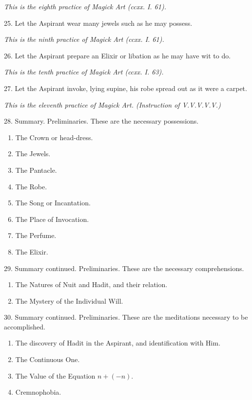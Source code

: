 \textit{This is the eighth practice of Magick Art (ccxx. I. 61).}

25. Let the Aspirant wear many jewels such as he may possess.

\textit{This is the ninth practice of Magick Art (ccxx. I. 61).}

26. Let the Aspirant prepare an Elixir or libation as he may have wit to do.

\textit{This is the tenth practice of Magick Art (ccxx. I. 63).}

27. Let the Aspirant invoke, lying supine, his robe spread out as it were a carpet.

\textit{This is the eleventh practice of Magick Art. (Instruction of V.V.V.V.V.)}

28. Summary. Preliminaries. These are the necessary possessions.
\begin{enumerate}[leftmargin=4\parindent]
\item The Crown or head-dress.
\item The Jewels.
\item The Pantacle.
\item The Robe.
\item The Song or Incantation.
\item The Place of Invocation.
\item The Perfume.
\item The Elixir.
\end{enumerate}

29. Summary continued. Preliminaries. These are the necessary comprehensions.

\begin{enumerate}[leftmargin=4\parindent]
\item The Natures of Nuit and Hadit, and their relation.
\item The Mystery of the Individual Will.
\end{enumerate}

30. Summary continued. Preliminaries. These are the meditations necessary to be accomplished.
\begin{enumerate}[leftmargin=4\parindent]
\item The discovery of Hadit in the Aspirant, and identification with Him.
\item The Continuous One.
\item The Value of the Equation $n + (-n)$.
\item Cremnophobia.
\end{enumerate}

